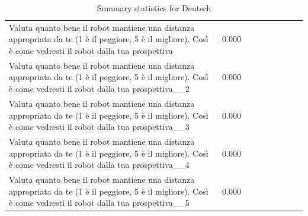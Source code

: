 \begin{table}[ht]
\begin{tabular}{lrrrrrrrr}
Valuta quanto bene il robot mantiene una distanza appropriata da te  (1 è il peggiore, 5 è il migliore). Così è come vedresti il robot dalla tua prospettiva & 0.000 &  &  &  &  &  &  &  \\
Valuta quanto bene il robot mantiene una distanza appropriata da te  (1 è il peggiore, 5 è il migliore). Così è come vedresti il robot dalla tua prospettiva__2 & 0.000 &  &  &  &  &  &  &  \\
Valuta quanto bene il robot mantiene una distanza appropriata da te  (1 è il peggiore, 5 è il migliore). Così è come vedresti il robot dalla tua prospettiva__3 & 0.000 &  &  &  &  &  &  &  \\
Valuta quanto bene il robot mantiene una distanza appropriata da te  (1 è il peggiore, 5 è il migliore). Così è come vedresti il robot dalla tua prospettiva__4 & 0.000 &  &  &  &  &  &  &  \\
Valuta quanto bene il robot mantiene una distanza appropriata da te  (1 è il peggiore, 5 è il migliore). Così è come vedresti il robot dalla tua prospettiva__5 & 0.000 &  &  &  &  &  &  &  \\
\bottomrule
\end{tabular}
\caption{Summary statistics for Deutsch}\n\label{tab:stats_Deutsch}\n\end{table}
